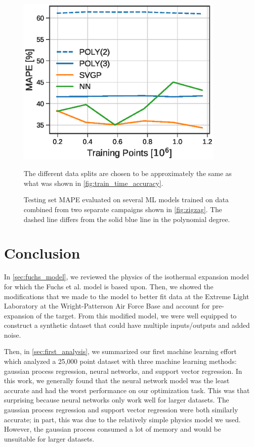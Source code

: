 \begin{figure}
	\centering
	\includegraphics[width=4in]{planning/images/paper2/fig11.eps}
	\caption{Testing set MAPE evaluated on several ML models trained on data combined from two separate campaigns shown in \autoref{fig:zigzag}. The dashed line differs from the solid blue line in the polynomial degree.} The different data splits are chosen to be approximately the same as what was shown in \autoref{fig:train_time_accuracy}.
	\label{fig:split_accuracy}
\end{figure}

\section{Conclusion} 

In \autoref{sec:fuchs_model}, we reviewed the physics of the isothermal expansion model for which the Fuchs et al. model is based upon. Then, we showed the modifications that we made to the model to better fit data at the Extreme Light Laboratory at the Wright-Patterson Air Force Base and account for pre-expansion of the target. From this modified model, we were well equipped to construct a synthetic dataset that could have multiple inputs/outputs and added noise.

Then, in \autoref{sec:first_analysis}, we summarized our first machine learning effort which analyzed a 25,000 point dataset with three machine learning methods: gaussian process regression, neural networks, and support vector regression. In this work, we generally found that the neural network model was the least accurate and had the worst performance on our optimization task. This was that surprising because neural networks only work well for larger datasets. The gaussian process regression and support vector regression were both similarly accurate; in part, this was due to the relatively simple physics model we used. However, the gaussian process consumed a lot of memory and would be unsuitable for larger datasets. 

